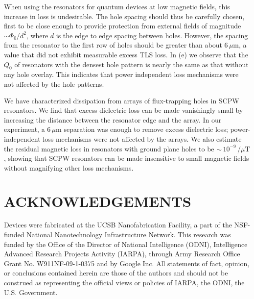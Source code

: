 When using the resonators for quantum devices at low magnetic fields, this increase in loss is undesirable.  The hole spacing should thus be carefully chosen, first to be close enough to provide protection from external fields of magnitude $\sim \Phi_0/d^2$, where $d$ is the edge to edge spacing between holes\cite{stan2004}.  However, the spacing from the resonator to the first row of holes should be greater than about $6\,\mu\textrm{m}$, a value that did not exhibit measurable excess TLS loss.  In (e) we observe that the $Q_0$ of resonators with the densest hole pattern is nearly the same as that without any hole overlay.  This indicates that power independent loss mechanisms were not affected by the hole patterns.

We have characterized dissipation from arrays of flux-trapping holes in SCPW resonators.  We find that excess dielectric loss can be made vanishingly small by increasing the distance between the resonator edge and the array.  In our experiment, a 6\,$\mu \text{m}$ separation was enough to remove excess dielectric loss; power-independent loss mechanisms were not affected by the arrays.  We also estimate the residual magnetic loss in resonators with ground plane holes to be $\sim$\,$10^{-9}$\,/$\mu\text{T}$, showing that SCPW resonators can be made insensitive to small magnetic fields without magnifying other loss mechanisms.

\section*{ACKNOWLEDGEMENTS}%
Devices were fabricated at the UCSB Nanofabrication Facility, a part of the NSF-funded National Nanotechnology Infrastructure Network.  This research was funded by the Office of the Director of National Intelligence (ODNI), Intelligence Advanced Research Projects Activity (IARPA), through Army Research Office Grant No. W911NF-09-1-0375 and by Google Inc. All statements of fact, opinion, or conclusions contained herein are those of the authors and should not be construed as representing the official views or policies of IARPA, the ODNI, the U.S. Government.

\clearpage
%






